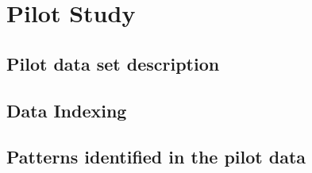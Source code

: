 \chapter{Pilot Study}

\section{Pilot data set description}

\section{Data Indexing}

\section{Patterns identified in the pilot data}
